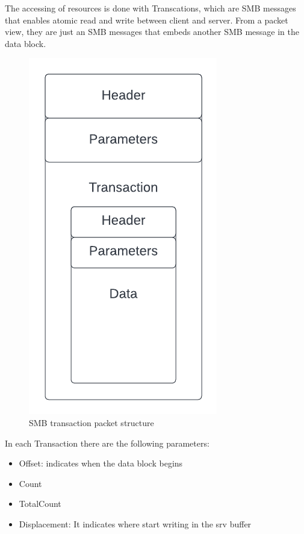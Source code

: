 The accessing of resources is done with Transcations, which are SMB messages that enables atomic read and write
between client and server.
From a packet view, they are just an SMB messages that embeds another SMB message in the data block.
\begin{figure}[ht!]
    \centering
      \includegraphics[scale=0.5]{images/smb_trans_structure.png}
      \caption{SMB transaction packet structure}
\end{figure}

In each Transaction there are the following parameters\cite{microsoft-transactions}:
\begin{itemize}
    \item Offset: indicates when the data block begins
    \item Count
    \item TotalCount
    \item Displacement: It indicates where start writing in the srv buffer
\end{itemize}


